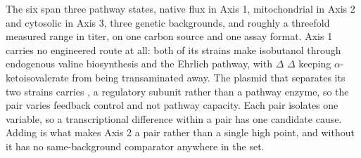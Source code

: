 

The six span three pathway states, native flux in Axis 1, mitochondrial in
Axis 2 and cytosolic in Axis 3, three genetic backgrounds, and roughly a
threefold measured range in titer, on one carbon source and one assay format.
Axis 1 carries no engineered route at all: both of its strains make isobutanol
through endogenous valine biosynthesis and the Ehrlich pathway, with
$\Delta$ $\Delta$ keeping
$\alpha$-ketoisovalerate from being transaminated away. The plasmid that
separates its two strains carries , a regulatory subunit rather than
a pathway enzyme, so the pair varies feedback control and not pathway capacity. Each pair isolates one variable,
so a transcriptional difference within a pair has one candidate cause. Adding
 is what makes Axis 2 a pair rather than a single high point, and
without it  has no same-background comparator anywhere in the set.
